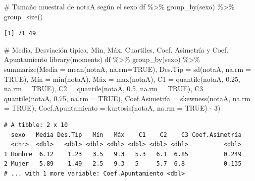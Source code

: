 \documentclass[
  a4paper,
]{scrreport}
\newenvironment{Shaded}{\begin{snugshade}}{\end{snugshade}}
\newcommand{\AttributeTok}[1]{\textcolor[rgb]{0.40,0.45,0.13}{#1}}
\newcommand{\CommentTok}[1]{\textcolor[rgb]{0.37,0.37,0.37}{#1}}
\newcommand{\ConstantTok}[1]{\textcolor[rgb]{0.56,0.35,0.01}{#1}}
\newcommand{\DecValTok}[1]{\textcolor[rgb]{0.68,0.00,0.00}{#1}}
\newcommand{\FloatTok}[1]{\textcolor[rgb]{0.68,0.00,0.00}{#1}}
\newcommand{\FunctionTok}[1]{\textcolor[rgb]{0.28,0.35,0.67}{#1}}
\newcommand{\NormalTok}[1]{\textcolor[rgb]{0.00,0.23,0.31}{#1}}
\newcommand{\OtherTok}[1]{\textcolor[rgb]{0.00,0.23,0.31}{#1}}
\newcommand{\SpecialCharTok}[1]{\textcolor[rgb]{0.37,0.37,0.37}{#1}}
\theoremstyle{definition}
\theoremstyle{definition}
\theoremstyle{remark}
\begin{document}
\begin{Shaded}
\begin{Highlighting}[]
\CommentTok{\# Tamaño muestral de notaA según el sexo}
\NormalTok{df }\SpecialCharTok{\%\textgreater{}\%} \FunctionTok{group\_by}\NormalTok{(sexo) }\SpecialCharTok{\%\textgreater{}\%} \FunctionTok{group\_size}\NormalTok{()}
\end{Highlighting}
\end{Shaded}

\begin{verbatim}
[1] 71 49
\end{verbatim}

\begin{Shaded}
\begin{Highlighting}[]
\CommentTok{\# Media, Desviación típica, Mín, Máx, Cuartiles, Coef. Asimetría y Coef. Apuntamiento}
\FunctionTok{library}\NormalTok{(moments)}
\NormalTok{df }\SpecialCharTok{\%\textgreater{}\%} \FunctionTok{group\_by}\NormalTok{(sexo) }\SpecialCharTok{\%\textgreater{}\%} \FunctionTok{summarize}\NormalTok{(}\AttributeTok{Media =} \FunctionTok{mean}\NormalTok{(notaA, }\AttributeTok{na.rm=}\ConstantTok{TRUE}\NormalTok{), }\AttributeTok{Des.Tip =} \FunctionTok{sd}\NormalTok{(notaA, }\AttributeTok{na.rm =} \ConstantTok{TRUE}\NormalTok{), Mín }\OtherTok{=} \FunctionTok{min}\NormalTok{(notaA), Máx }\OtherTok{=} \FunctionTok{max}\NormalTok{(notaA), }\AttributeTok{C1 =} \FunctionTok{quantile}\NormalTok{(notaA, }\FloatTok{0.25}\NormalTok{, }\AttributeTok{na.rm =} \ConstantTok{TRUE}\NormalTok{), }\AttributeTok{C2 =} \FunctionTok{quantile}\NormalTok{(notaA, }\FloatTok{0.5}\NormalTok{, }\AttributeTok{na.rm =} \ConstantTok{TRUE}\NormalTok{), }\AttributeTok{C3 =} \FunctionTok{quantile}\NormalTok{(notaA, }\FloatTok{0.75}\NormalTok{, }\AttributeTok{na.rm =} \ConstantTok{TRUE}\NormalTok{), Coef.Asimetría }\OtherTok{=} \FunctionTok{skewness}\NormalTok{(notaA, }\AttributeTok{na.rm =} \ConstantTok{TRUE}\NormalTok{), }\AttributeTok{Coef.Apuntamiento =} \FunctionTok{kurtosis}\NormalTok{(notaA, }\AttributeTok{na.rm =} \ConstantTok{TRUE}\NormalTok{) }\SpecialCharTok{{-}} \DecValTok{3}\NormalTok{)}
\end{Highlighting}
\end{Shaded}

\begin{verbatim}
# A tibble: 2 x 10
  sexo   Media Des.Tip   Mín   Máx    C1    C2    C3 Coef.Asimetría
  <chr>  <dbl>   <dbl> <dbl> <dbl> <dbl> <dbl> <dbl>          <dbl>
1 Hombre  6.12    1.23   3.5   9.3   5.3   6.1  6.85          0.249
2 Mujer   5.89    1.49   2.5   9.3   5     5.7  6.8           0.135
# ... with 1 more variable: Coef.Apuntamiento <dbl>
\end{verbatim}
\end{document}
